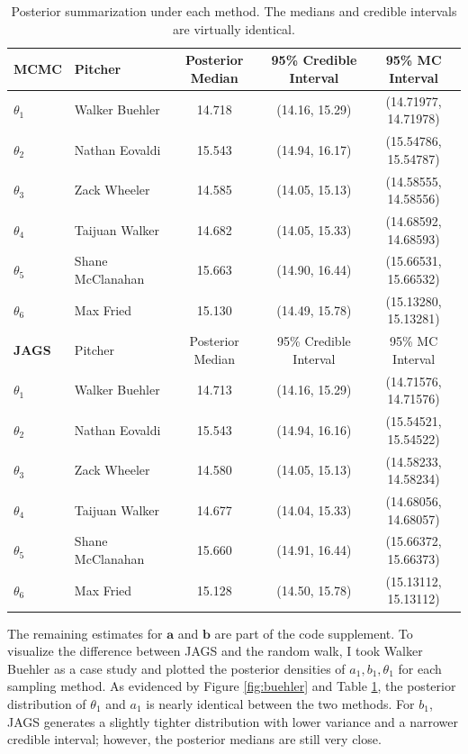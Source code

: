 \documentclass{article}
\begin{document}
\begin{table}[h]
    \centering
    {\small %
    \begin{tabular}{llccc}
         \hline
         \textbf{MCMC} & Pitcher & Posterior Median & 95\% Credible Interval & 95\% MC Interval \\
         \hline
         $\theta_1$ & Walker Buehler & 14.718 & (14.16, 15.29) & (14.71977, 14.71978) \\
         $\theta_2$ & Nathan Eovaldi & 15.543 & (14.94, 16.17) & (15.54786, 15.54787) \\
         $\theta_3$ & Zack Wheeler & 14.585 & (14.05, 15.13) & (14.58555, 14.58556) \\
         $\theta_4$ & Taijuan Walker & 14.682 & (14.05, 15.33) & (14.68592, 14.68593) \\
         $\theta_5$ & Shane McClanahan & 15.663 & (14.90, 16.44) & (15.66531, 15.66532) \\
         $\theta_6$ & Max Fried & 15.130 & (14.49, 15.78) & (15.13280, 15.13281) \\
         \hline
         \textbf{JAGS} & Pitcher & Posterior Median & 95\% Credible Interval & 95\% MC Interval \\
         \hline
         $\theta_1$ & Walker Buehler & 14.713 & (14.16, 15.29) & (14.71576, 14.71576) \\
         $\theta_2$ & Nathan Eovaldi &  15.543 & (14.94, 16.16) & (15.54521, 15.54522) \\
         $\theta_3$ & Zack Wheeler & 14.580 & (14.05, 15.13) & (14.58233, 14.58234) \\
         $\theta_4$ & Taijuan Walker & 14.677 & (14.04, 15.33) & (14.68056, 14.68057) \\
         $\theta_5$ & Shane McClanahan & 15.660 & (14.91, 16.44) & (15.66372, 15.66373) \\
         $\theta_6$ & Max Fried & 15.128 & (14.50, 15.78) & (15.13112, 15.13112) \\
         \hline
    \end{tabular}
    }%
    \caption{Posterior summarization under each method. The medians and credible intervals are virtually identical.}
    \label{tab:bayes-ests}
\end{table}

The remaining estimates for $\mathbf{a}$ and $\mathbf{b}$ are part of the code supplement. To visualize the difference between JAGS and the random walk, I took Walker Buehler as a case study and plotted the posterior densities of $a_1,b_1,\theta_1$ for each sampling method. As evidenced by Figure \ref{fig:buehler} and Table \ref{tab:bayes-ests}, the posterior distribution of $\theta_1$ and $a_1$ is nearly identical between the two methods. For $b_1$, JAGS generates a slightly tighter distribution with lower variance and a narrower credible interval; however, the posterior medians are still very close.
\end{document}
